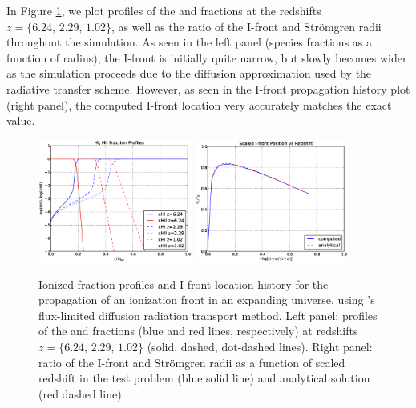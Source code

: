 In Figure \ref{fig.fld}, we plot profiles of the  and
 fractions at the redshifts $z=\{6.24,\, 2.29,\, 1.02\}$, as
well as the ratio of the I-front and Str{\" o}mgren radii throughout
the simulation.  As seen in the left panel (species fractions as a
function of radius), the I-front is initially quite narrow, but slowly
becomes wider as the simulation proceeds due to the diffusion
approximation used by the radiative transfer scheme.  However, as seen
in the I-front propagation history plot (right panel), the computed
I-front location very accurately matches the exact value.

\begin{figure}
\begin{center}
\includegraphics[width=0.45\textwidth]{figures/FLDprofiles.eps}
\includegraphics[width=0.45\textwidth]{figures/FLDhistory.eps}
\caption{Ionized fraction profiles and I-front location history for
the propagation of an ionization front in an expanding universe, using
\enzo's flux-limited diffusion radiation transport method.  Left
panel: profiles of the  and  fractions (blue and
red lines, respectively) at redshifts $z=\{6.24,\, 2.29,\, 1.02\}$
(solid, dashed, dot-dashed lines).  Right panel: ratio of the I-front
and Str{\" o}mgren radii as a function of scaled redshift in the test
problem (blue solid line) and analytical solution (red dashed line).}
\label{fig.fld}
\end{center}
\end{figure}

